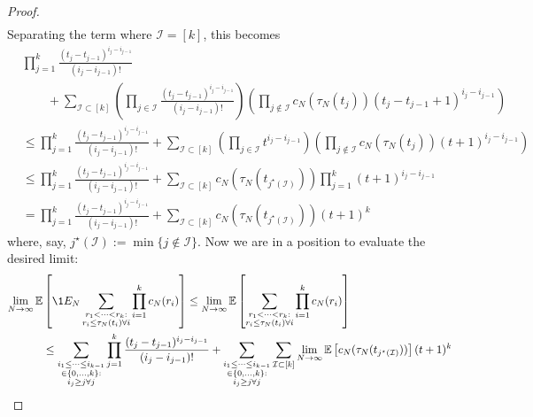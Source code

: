\begin{proof}
\begin{align*}
\end{align*}
Separating the term where $\mathcal{I} = [k]$, this becomes
\begin{align*}        
& \prod_{j=1}^k \frac{(t_j - t_{j-1})^{i_j - i_{j-1}}}{(i_j - i_{j-1})!} \\
    &\qquad+ \sum_{\mathcal{I} \subset [k]} \left( \prod_{j\in\mathcal{I}} 
        \frac{(t_j - t_{j-1})^{i_j - i_{j-1}}}{(i_j - i_{j-1})!}\right)
        \left( \prod_{j\notin\mathcal{I}} c_N(\tau_N(t_j)) 
        ( t_j - t_{j-1} +1 )^{i_j - i_{j-1}} \right) \\
&\leq \prod_{j=1}^k \frac{(t_j - t_{j-1})^{i_j - i_{j-1}}}{(i_j - i_{j-1})!} 
    + \sum_{\mathcal{I} \subset [k]} \left( \prod_{j\in\mathcal{I}} 
        t^{i_j - i_{j-1}}\right)
        \left( \prod_{j\notin\mathcal{I}} c_N(\tau_N(t_j)) 
        (t+1)^{i_j - i_{j-1}} \right) \\
&\leq \prod_{j=1}^k \frac{(t_j - t_{j-1})^{i_j - i_{j-1}}}{(i_j - i_{j-1})!}
        + \sum_{\mathcal{I} \subset [k]} c_N(\tau_N(t_{j^\star(\mathcal{I})})) 
        \prod_{j=1}^k ( t+1 )^{i_j - i_{j-1}} \\
&=  \prod_{j=1}^k \frac{(t_j - t_{j-1})^{i_j - i_{j-1}}}{(i_j - i_{j-1})!}
        + \sum_{\mathcal{I} \subset [k]} c_N(\tau_N(t_{j^\star(\mathcal{I})})) 
        ( t+1 )^k 
\end{align*}
where, say, $j^\star(\mathcal{I}) := \min\{ j\notin\mathcal{I}\}$.
Now we are in a position to evaluate the desired limit: 
\begin{align*}
\lim_{N\to\infty} \E &\left[ \1{E_N} 
        \sum_{\substack{r_1<\dots<r_k :\\ r_i\leq \tau_N(t_i) \forall i}} 
        \prod_{i=1}^k c_N(r_i) \right] 
\leq \lim_{N\to\infty} \E \left[\sum_{\substack{r_1<\dots<r_k :\\ 
        r_i\leq \tau_N(t_i) \forall i}} \prod_{i=1}^k c_N(r_i) \right] \\
&\leq \sum_{\substack{i_1\leq \dots\leq i_{k-1}\\ \in \{0,\dots,k\} :\\ 
        i_j \geq j \forall j}} \prod_{j=1}^k \frac{(t_j - t_{j-1})^{i_j - i_{j-1}}}
        {(i_j - i_{j-1})!}
        + \sum_{\substack{i_1\leq \dots\leq i_{k-1}\\ \in \{0,\dots,k\} 
        :\\ i_j \geq j \forall j}} \sum_{\mathcal{I} \subset [k]} \lim_{N\to\infty} 
        \E \left[ c_N(\tau_N(t_{j^\star(\mathcal{I})})) \right] 
        (t+1)^k \\

\end{align*}
\end{proof}
